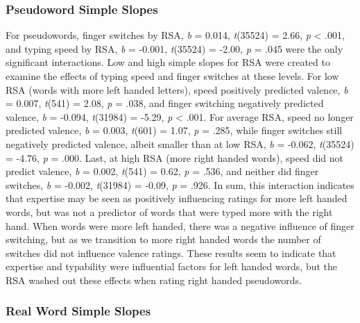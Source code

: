 \documentclass[english,man]{apa6}
\theoremstyle{definition}
\theoremstyle{definition}
\theoremstyle{definition}
\theoremstyle{remark}
\begin{document}
\subsubsection{Pseudoword Simple Slopes}\label{pseudoword-simple-slopes}

For pseudowords, finger switches by RSA, \emph{b} = 0.014,
\emph{t}(35524) = 2.66, \emph{p} \textless{} .001, and typing speed by
RSA, \emph{b} = -0.001, \emph{t}(35524) = -2.00, \emph{p} = .045 were
the only significant interactions. Low and high simple slopes for RSA
were created to examine the effects of typing speed and finger switches
at these levels. For low RSA (words with more left handed letters),
speed positively predicted valence, \emph{b} = 0.007, \emph{t}(541) =
2.08, \emph{p} = .038, and finger switching negatively predicted
valence, \emph{b} = -0.094, \emph{t}(31984) = -5.29, \emph{p}
\textless{} .001. For average RSA, speed no longer predicted valence,
\emph{b} = 0.003, \emph{t}(601) = 1.07, \emph{p} = .285, while finger
switches still negatively predicted valence, albeit smaller than at low
RSA, \emph{b} = -0.062, \emph{t}(35524) = -4.76, \emph{p} = .000. Last,
at high RSA (more right handed words), speed did not predict valence,
\emph{b} = 0.002, \emph{t}(541) = 0.62, \emph{p} = .536, and neither did
finger switches, \emph{b} = -0.002, \emph{t}(31984) = -0.09, \emph{p} =
.926. In sum, this interaction indicates that expertise may be seen as
positively influencing ratings for more left handed words, but was not a
predictor of words that were typed more with the right hand. When words
were more left handed, there was a negative influence of finger
switching, but as we transition to more right handed words the number of
switches did not influence valence ratings. These results seem to
indicate that expertise and typability were influential factors for left
handed words, but the RSA washed out these effects when rating right
handed pseudowords.

\subsubsection{Real Word Simple Slopes}\label{real-word-simple-slopes}
\end{document}
